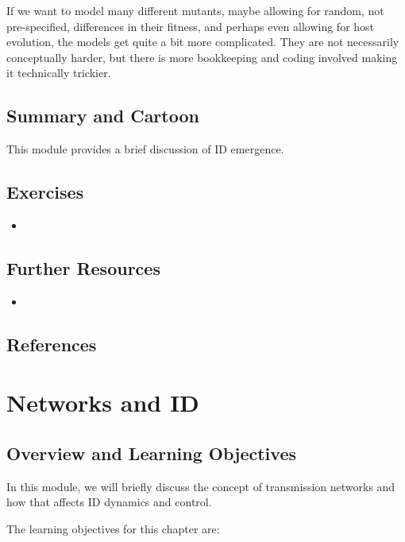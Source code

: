 \documentclass[]{book}
\theoremstyle{definition}
\theoremstyle{definition}
\theoremstyle{definition}
\theoremstyle{remark}
\begin{document}
If we want to model many different mutants, maybe allowing for random,
not pre-specified, differences in their fitness, and perhaps even
allowing for host evolution, the models get quite a bit more
complicated. They are not necessarily conceptually harder, but there is
more bookkeeping and coding involved making it technically trickier.

\section{Summary and Cartoon}\label{summary-and-cartoon-14}

This module provides a brief discussion of ID emergence.

\section{Exercises}\label{exercises-14}

\begin{itemize}
\item
\end{itemize}

\section{Further Resources}\label{further-resources-14}

\begin{itemize}
\item
\end{itemize}

\section{References}\label{references-15}

\chapter{Networks and ID}\label{networks-and-id}

\section{Overview and Learning
Objectives}\label{overview-and-learning-objectives-15}

In this module, we will briefly discuss the concept of transmission
networks and how that affects ID dynamics and control.

The learning objectives for this chapter are:
\end{document}
